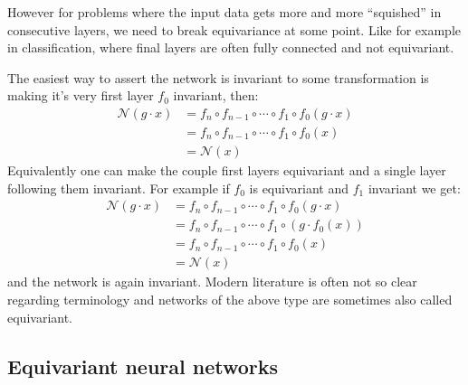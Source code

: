         However for problems where the input data gets more and more ``squished'' in consecutive layers,
        we need to break equivariance at some point. Like for example in classification,
        where final layers are often fully connected and not equivariant. \par
        The easiest way to assert the network is invariant to some transformation
        is making it's very first layer $f_0$ invariant, then:
        \begin{align*}
            \mathcal{N}(g\cdot x)
            &= f_n \circ f_{n-1} \circ \cdots \circ f_1 \circ f_0(g\cdot x)  \\
            &= f_n \circ f_{n-1} \circ \cdots \circ f_1 \circ f_0(x) \\
            &= \mathcal{N}(x)
        \end{align*}
        Equivalently \cite{lie_transformer}
        one can make the couple first layers equivariant and a single layer
        following them invariant. For example if $f_0$ is equivariant and $f_1$ invariant we get:
        \begin{align*}
            \mathcal{N}(g\cdot x)
            &= f_n \circ f_{n-1} \circ \cdots \circ f_1 \circ f_0(g\cdot x)  \\
            &= f_n \circ f_{n-1} \circ \cdots \circ f_1 \circ \left( g \cdot f_0(x) \right) \\
            &= f_n \circ f_{n-1} \circ \cdots \circ f_1 \circ f_0(x) \\
            &= \mathcal{N}(x)
        \end{align*}
        and the network is again invariant. Modern literature is often not so
        clear regarding terminology and networks of the above type are sometimes
        also called equivariant.

\subsection{Equivariant neural networks}
